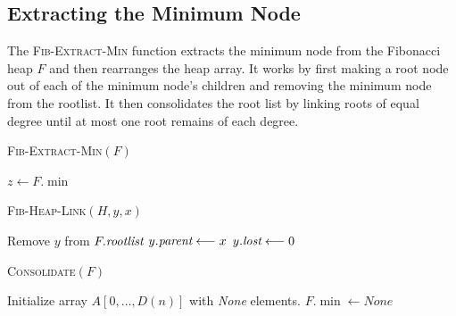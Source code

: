 \subsection{Extracting the Minimum Node}
The \textsc{Fib-Extract-Min} function extracts the minimum node from the Fibonacci heap $F$ and then rearranges the heap array. It works by first making a root node out of each of the minimum node's children and removing the minimum node from the rootlist. It then consolidates the root list by linking roots of equal degree until at most one root remains of each degree.
\begin{center}
	\begin{minipage}{0.45\textwidth}
		\begin{algorithm}[H]
			\caption{\textsc{Fib-Extract-Min}$(F)$}
			\DontPrintSemicolon
			$z\longleftarrow F.\min$\;
		\end{algorithm}
		\vspace{2.8cm}

		\begin{algorithm}[H]
			\caption{\textsc{Fib-Heap-Link}$(H,y,x)$}
			\DontPrintSemicolon
			Remove $y$ from $F.\emph{rootlist}$\;
			$y.\emph{parent}\longleftarrow x$\;
			$y.\emph{lost}\longleftarrow 0$
		\end{algorithm}
	\end{minipage}\hfill
	\begin{minipage}{0.5\textwidth}
		\begin{algorithm}[H]
			\caption{\textsc{Consolidate}$(F)$}
			\DontPrintSemicolon
			Initialize array $A[0,\dots, D(n)]$ with \emph{None} elements.\;
			$F.\min\longleftarrow None$\;
		\end{algorithm}
	\end{minipage}
\end{center}

